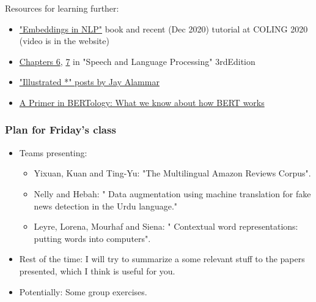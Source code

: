 \documentclass{beamer}
\begin{document}
\begin{frame}{Resources for learning further:}
    \begin{itemize}
        \item \href{https://sites.google.com/view/embeddings-in-nlp/}{"Embeddings in NLP"} book and recent (Dec 2020) tutorial at COLING 2020 (video is in the website)
        \item \href{https://web.stanford.edu/~jurafsky/slp3/6.pdf}{Chapters 6}, \href{https://web.stanford.edu/~jurafsky/slp3/7.pdf}{7} in "Speech and Language Processing" 3rdEdition
        \item \href{http://jalammar.github.io/}{"Illustrated *" posts by Jay Alammar}
        \item \href{https://arxiv.org/abs/2002.12327}{A Primer in BERTology: What we know about how BERT works}
    \end{itemize}
\end{frame}

\begin{frame}
\frametitle{Plan for Friday's class}
\begin{itemize}
\item Teams presenting:
\begin{itemize}
    \item Yixuan, Kuan and Ting-Yu: "The Multilingual Amazon Reviews Corpus".
    \item Nelly and Hebah: " Data augmentation using machine translation for fake news detection in the Urdu language."
    \item Leyre, Lorena, Mourhaf and Siena: " Contextual word representations: putting words into computers".
\end{itemize}
\item Rest of the time: I will try to summarize a some relevant stuff to the papers presented, which I think is useful for you.
\item Potentially: Some group exercises.
\end{itemize}
\end{frame}
\end{document}
